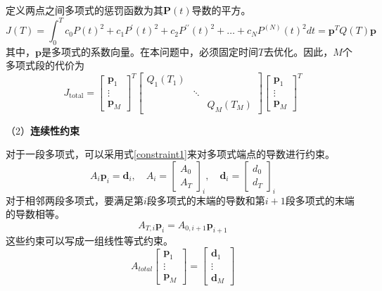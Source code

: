 定义两点之间多项式的惩罚函数为其$\mathbf{P}(t)$导数的平方。
\begin{equation}
    J(T)=\int_0^Tc_0P(t)^2+c_1P^{\prime}(t)^2+c_2P^{\prime\prime}(t)^2+\ldots+c_NP^{(N)}(t)^2dt=\mathbf{p}^TQ(T)\mathbf{p}
\end{equation}
其中，$\mathbf{p}$是多项式的系数向量。在本问题中，必须固定时间$T$去优化。因此，$M$个多项式段的代价为
\begin{equation}\label{fun1}
    J_{\text{total}} = 
    \begin{bmatrix}
    \mathbf{p}_1 \\
    \vdots \\
    \mathbf{p}_M
    \end{bmatrix}^T
    \begin{bmatrix}
    Q_1(T_1) \\
    & \ddots \\
    && Q_M(T_M)
    \end{bmatrix}
    \begin{bmatrix}
    \mathbf{p}_1 \\
    \vdots \\
    \mathbf{p}_M
    \end{bmatrix}^T    
\end{equation}


（2）\textbf{连续性约束}


对于一段多项式，可以采用式\ref{constraint1}来对多项式端点的导数进行约束。
\begin{equation}\label{constraint1}
    A_i\mathbf{p}_i=\mathbf{d}_i,\quad A_i=\begin{bmatrix}A_0\\A_T\end{bmatrix}_i,\quad\mathbf{d}_i=\begin{bmatrix}d_0\\d_T\end{bmatrix}_i
\end{equation}
对于相邻两段多项式，要满足第$i$段多项式的末端的导数和第$i+1$段多项式的末端的导数相等。
\begin{equation}
    A_{T,i}\mathbf{p}_i=A_{0,i+1}\mathbf{p}_{i+1}
\end{equation}
这些约束可以写成一组线性等式约束。
\begin{equation}\label{constraint2}
    A_{total}\begin{bmatrix}\mathbf{p}_1\\\vdots\\\mathbf{p}_M\end{bmatrix}=\begin{bmatrix}\mathbf{d}_1\\\vdots\\\mathbf{d}_M\end{bmatrix}
\end{equation}

